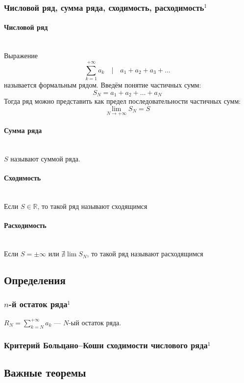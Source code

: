 \documentclass{article}
\let\vanillaparagraph\paragraph
\renewcommand{\paragraph}[1]{\vanillaparagraph{#1}\mbox{}\\}
\begin{document}
\subsubsection{Числовой ряд, сумма ряда, сходимость, расходимость\texorpdfstring{$^1$}{}}
\paragraph{Числовой ряд}
Выражение
$$
\sum_{k=1}^{+\infty} a_k \quad | \quad a_1+a_2+a_3+\ldots
$$
называется формальным рядом. Введём понятие частичных сумм:
$$
S_N = a_1+a_2+\ldots+a_N
$$
Тогда ряд можно представить как предел последовательности частичных сумм:
$$
\lim_{N\rightarrow +\infty} S_N = S
$$

\paragraph{Сумма ряда}
$S$ называют суммой ряда.
\paragraph{Сходимость}
Если $S \in \mathbb{R}$, то такой ряд называют сходящимся
\paragraph{Расходимость}
Если $S = \pm\infty$ или $\nexists \lim S_N$, то такой ряд называют расходящимся



\newpage
\subsection{Определения}

\subsubsection{\texorpdfstring{$n$}{n}-й остаток ряда\texorpdfstring{$^1$}{}}
$R_N = \sum_{k=N}^{+\infty} a_k$ --- $N$-ый остаток ряда.

\subsubsection{Критерий Больцано--Коши сходимости числового ряда\texorpdfstring{$^1$}{}}

\newpage
\subsection{Важные теоремы}
\end{document}
